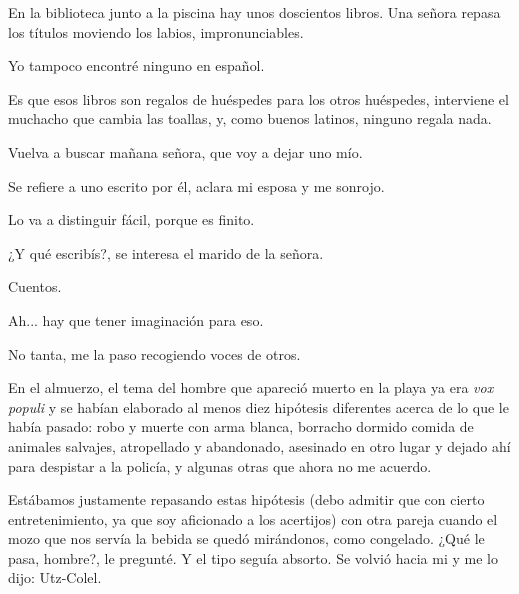 \documentclass[12pt,twoside,openright,a5paper]{book}
\begin{document}
\hrulefill\hspace{0.2cm} \decofourleft\decofourright \hspace{0.2cm} \hrulefill
\vspace{0.5cm}

En la biblioteca junto a la piscina hay unos doscientos libros.  Una señora
repasa los títulos moviendo los labios, impronunciables.

Yo tampoco encontré ninguno en español.

Es que esos libros son regalos de huéspedes para los otros huéspedes,
interviene el muchacho que cambia las toallas, y, como buenos latinos, ninguno
regala nada.

Vuelva a buscar mañana señora, que voy a dejar uno mío.

Se refiere a uno escrito por él, aclara mi esposa y me sonrojo.

Lo va a distinguir fácil, porque es finito.

¿Y qué escribís?, se interesa el marido de la señora.

Cuentos.

Ah... hay que tener imaginación para eso.

No tanta, me la paso recogiendo voces de otros.

\vspace{0.5cm}

\hrulefill\hspace{0.2cm} \decofourleft\decofourright \hspace{0.2cm} \hrulefill
\vspace{0.5cm}

En el almuerzo, el tema del hombre que apareció muerto en la playa ya era
\emph{vox populi} y se habían elaborado al menos diez hipótesis diferentes
acerca de lo que le había pasado: robo y muerte con arma blanca, borracho
dormido comida de animales salvajes, atropellado y abandonado, asesinado
en otro lugar y dejado ahí para despistar a la policía, y algunas otras
que ahora no me acuerdo.

Estábamos justamente repasando estas hipótesis (debo admitir que con cierto
entretenimiento, ya que soy aficionado a los acertijos) con otra
pareja cuando el mozo que nos servía la bebida se quedó mirándonos,
como congelado. ¿Qué le pasa, hombre?, le pregunté. Y el tipo seguía
absorto. Se volvió hacia mi y me lo dijo: Utz-Colel.

\vspace{0.5cm}
\end{document}
